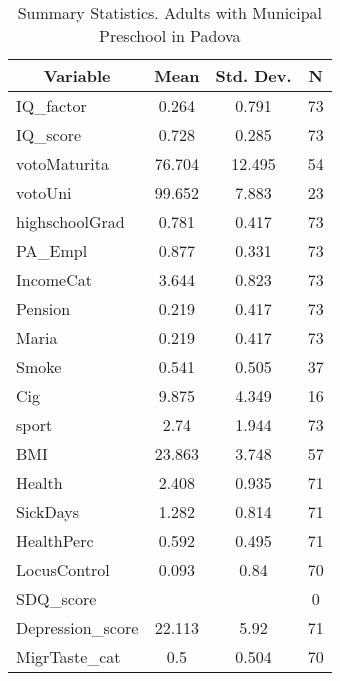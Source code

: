 
\begin{table}[htbp]\centering \caption{Summary Statistics. Adults with Municipal Preschool in Padova \label{bothAdultmaternaMuniPadova}}
\begin{tabular}{l c c  c}\hline\hline
\multicolumn{1}{c}{\textbf{Variable}} & \textbf{Mean}
 & \textbf{Std. Dev.} & \textbf{N}\\ \hline
IQ\_factor & 0.264 & 0.791  & 73\\
IQ\_score & 0.728 & 0.285  & 73\\
votoMaturita & 76.704 & 12.495  & 54\\
votoUni & 99.652 & 7.883  & 23\\
highschoolGrad & 0.781 & 0.417  & 73\\
PA\_Empl & 0.877 & 0.331  & 73\\
IncomeCat & 3.644 & 0.823  & 73\\
Pension & 0.219 & 0.417  & 73\\
Maria & 0.219 & 0.417  & 73\\
Smoke & 0.541 & 0.505  & 37\\
Cig & 9.875 & 4.349  & 16\\
sport & 2.74 & 1.944  & 73\\
BMI & 23.863 & 3.748  & 57\\
Health & 2.408 & 0.935  & 71\\
SickDays & 1.282 & 0.814  & 71\\
HealthPerc & 0.592 & 0.495  & 71\\
LocusControl & 0.093 & 0.84  & 70\\
SDQ\_score &  &   & 0\\
Depression\_score & 22.113 & 5.92  & 71\\
MigrTaste\_cat & 0.5 & 0.504  & 70\\
\hline\end{tabular}
\end{table}
